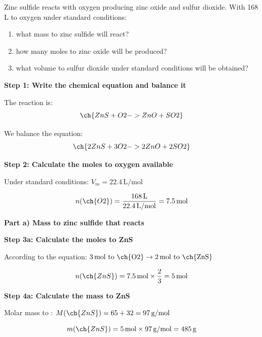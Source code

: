 \begin{exercise}
    Zinc sulfide reacts with oxygen producing zinc oxide and sulfur dioxide.
    With 168 L to oxygen under standard conditions:
    \begin{enumerate}[label=\letraminuscula]
    \item
    what mass to zinc sulfide will react?
    \item
    how many moles to zinc oxide will be produced?
    \item
    what volume to sulfur dioxide under standard conditions will be obtained?
    \end{enumerate}
    \begin{solu}
        \textbf{Step 1: Write the chemical equation and balance it}

        The reaction is:
        \begin{equation*}
            \ch{ZnS + O2 -> ZnO + SO2}
        \end{equation*}

        We balance the equation:
        \begin{equation*}
            \ch{2 ZnS + 3 O2 -> 2 ZnO + 2 SO2}
        \end{equation*}

        \textbf{Step 2: Calculate the moles to oxygen available}

        Under standard conditions: $V_m = 22.4\,\text{L/mol}$

        \begin{equation*}
            n(\ch{O2}) = \frac{168\,\text{L}}{22.4\,\text{L/mol}} = 7.5\,\text{mol}
        \end{equation*}

        \textbf{Part a) Mass to zinc sulfide that reacts}

        \textbf{Step 3a: Calculate the moles to ZnS}

        According to the equation: $3\,\text{mol to \ch{O2}} \rightarrow 2\,\text{mol to \ch{ZnS}}$

        \begin{equation*}
            n(\ch{ZnS}) = 7.5\,\text{mol} \times \frac{2}{3} = 5\,\text{mol}
        \end{equation*}

        \textbf{Step 4a: Calculate the mass to ZnS}

        Molar mass to : $M(\ch{ZnS}) = 65 + 32 = 97\,\text{g/mol}$

        \begin{equation*}
            m(\ch{ZnS}) = 5\,\text{mol} \times 97\,\text{g/mol} = 485\,\text{g}
        \end{equation*}


\end{solu}
\end{exercise}
